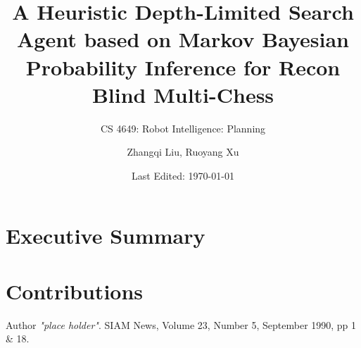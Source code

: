 \documentclass[11pt]{article}
\title{A Heuristic Depth-Limited Search Agent based on Markov Bayesian Probability Inference for Recon Blind Multi-Chess}
\author{Zhangqi Liu, Ruoyang Xu}
\subtitle{CS 4649: Robot Intelligence: Planning}
\date{Last Edited: \today}
\begin{document}
\maketitle
\pagebreak

\section{Executive Summary}
\section{Contributions}

\begin{thebibliography}{9}
    Author
    \textit{"place holder"}. 
    SIAM News, Volume 23, Number 5, September 1990, pp 1 \& 18. 
\end{thebibliography}
\end{document}

